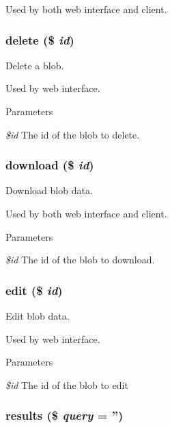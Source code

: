 Used by both web interface and client. \hypertarget{class_blobs_controller_a2f8258add505482d7f00ea26493a5723}{
\subsubsection[{delete}]{\setlength{\rightskip}{0pt plus 5cm}delete (\$ {\em id})}}
\label{class_blobs_controller_a2f8258add505482d7f00ea26493a5723}


Delete a blob. 

Used by web interface. 
\begin{DoxyParams}{Parameters}
\item[{\em \$id}]The id of the blob to delete. \end{DoxyParams}
\hypertarget{class_blobs_controller_ad6a5f919a44257e2b5a5109cc6fc5fe2}{
\subsubsection[{download}]{\setlength{\rightskip}{0pt plus 5cm}download (\$ {\em id})}}
\label{class_blobs_controller_ad6a5f919a44257e2b5a5109cc6fc5fe2}


Download blob data. 

Used by both web interface and client. 
\begin{DoxyParams}{Parameters}
\item[{\em \$id}]The id of the blob to download. \end{DoxyParams}
\hypertarget{class_blobs_controller_a459ed16587e3a50b39b672c7e473abc5}{
\subsubsection[{edit}]{\setlength{\rightskip}{0pt plus 5cm}edit (\$ {\em id})}}
\label{class_blobs_controller_a459ed16587e3a50b39b672c7e473abc5}


Edit blob data. 

Used by web interface. 
\begin{DoxyParams}{Parameters}
\item[{\em \$id}]The id of the blob to edit \end{DoxyParams}
\hypertarget{class_blobs_controller_ab633a32e024a1dc81243c199d7a8e4d7}{
\subsubsection[{results}]{\setlength{\rightskip}{0pt plus 5cm}results (\$ {\em query} = {\ttfamily ''})}}
\label{class_blobs_controller_ab633a32e024a1dc81243c199d7a8e4d7}


